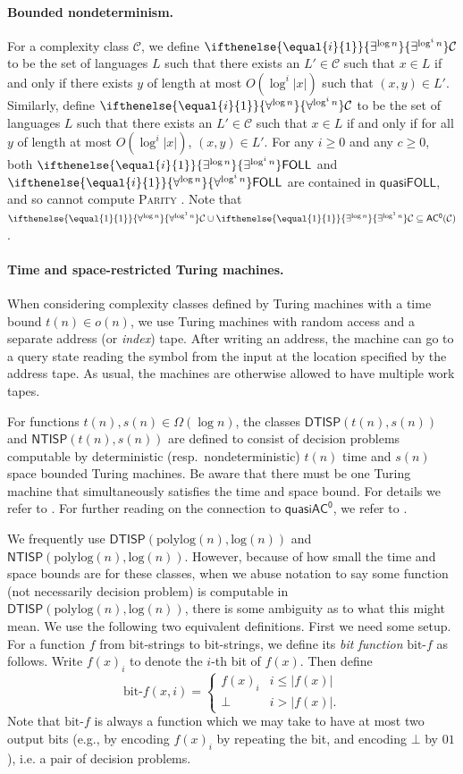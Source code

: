 \documentclass{article}
\newcommand{\algprobm}[1]{\textsc{#1}\xspace}
\newcommand{\betacc}[1]{\ifthenelse{\equal{#1}{1}}{\exists^{\log n}}{\exists^{\log^{#1}n}}} %
\newcommand{\alphacc}[1]{\ifthenelse{\equal{#1}{1}}{\forall^{\log n}}{\forall^{\log^{#1}n}}} %
\newcommand*{\ComplexityClass}[1]{\ensuremath{\mathsf{#1}}\xspace}
\newcommand{\NTISP}{\ComplexityClass{NTISP}}
\newcommand{\DTISP}{\ComplexityClass{DTISP}}
\newcommand{\NTISPpll}{\ensuremath{\NTISP(\mathrm{polylog}(n),\mathrm{log}(n))}\xspace}
\newcommand{\DTISPpll}{\ensuremath{\DTISP(\mathrm{polylog}(n),\mathrm{log}(n))}\xspace}
\newcommand{\ACz}{\ComplexityClass{AC^0}}
\newcommand{\qACz}{\ComplexityClass{quasiAC^0}}
\newcommand{\FOLL}{\ComplexityClass{FOLL}}
\begin{document}
\paragraph{Bounded nondeterminism.} For a complexity class $\mathcal{C}$, we define $\betacc{i}\mathcal{C}$ to be the set of languages $L$ such that there exists an $L' \in \mathcal{C}$ such that $x \in L$ if and only if there exists $y$ of length at most $O(\log^{i} |x|)$ such that $(x, y) \in L'$. Similarly, define $\alphacc{i}\mathcal{C}$ to be the set of languages $L$ such that there exists an $L' \in \mathcal{C}$ such that $x \in L$ if and only if for all $y$ of length at most $O(\log^{i} |x|)$, $(x,y) \in L'$. For any $i \geq 0$ and any $c \geq 0$, both $\betacc{i}\FOLL$ and $\alphacc{i}\FOLL$ are contained in  $\mathsf{quasi}\FOLL$, and so cannot compute \algprobm{Parity} \cite{ChattopadhyayToranWagner, Smolensky87algebraicmethods}. Note that $\alphacc{1}\mathcal{C} \cup  \betacc{1}\mathcal{C}\subseteq \ACz(\mathcal{C})$.

\paragraph{Time and space-restricted Turing machines.}
When considering complexity classes defined by Turing machines with a time bound $t(n) \in o(n)$, we use Turing machines with random access and a separate address (or \emph{index}) tape. After writing an address, the machine can go to a query state reading the symbol from the input at the location specified by the address tape. As usual, the machines are otherwise allowed to have multiple work tapes. 

For functions $t(n), s(n) \in \Omega(\log n)$, the classes $\DTISP(t(n),s(n)) $ and $\NTISP(t(n),s(n)) $ are defined to consist of decision problems computable by deterministic (resp.\ nondeterministic) $t(n)$ time and $s(n)$ space bounded Turing machines. Be aware that there must be one Turing machine that simultaneously satisfies the time and space bound. For details we refer to \cite[Section 2.6]{VollmerText}. For further reading on the connection to \qACz, we refer to \cite{BarringtonQuasipolynomial,FerrarottiGonzalezScheweTurull}.

We frequently use $\DTISPpll$ and $\NTISPpll$. However, because of how small the time and space bounds are for these classes, when we abuse notation to say some function (not necessarily decision problem) is computable in $\DTISPpll$, there is some ambiguity as to what this might mean. We use the following two equivalent definitions. First we need some setup. For a function $f$ from bit-strings to bit-strings, we define its \emph{bit function} $\text{bit-}f$ as follows. Write $f(x)_i$ to denote the $i$-th bit of $f(x)$. Then define
\[
\text{bit-}f(x,i) = \begin{cases}
f(x)_i & i \leq |f(x)| \\
\bot & i > |f(x)|.
\end{cases}
\]
Note that $\text{bit-}f$ is always a function which we may take to have at most two output bits (e.g., by encoding $f(x)_i$ by repeating the bit, and encoding $\bot$ by $01$), i.e. a pair of decision problems.
\end{document}
